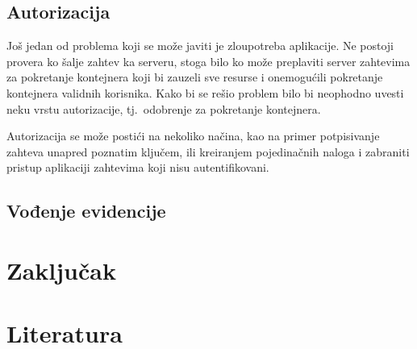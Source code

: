 \documentclass[12pt]{report}
\begin{document}
\section{Autorizacija}
Još jedan od problema koji se može javiti je zloupotreba aplikacije. Ne postoji provera ko šalje zahtev ka serveru, stoga bilo ko može preplaviti server zahtevima za pokretanje kontejnera koji bi zauzeli sve resurse i onemogućili pokretanje kontejnera validnih korisnika. Kako bi se rešio problem bilo bi neophodno uvesti neku vrstu autorizacije, tj.\ odobrenje za pokretanje kontejnera.

Autorizacija se može postići na nekoliko načina, kao na primer potpisivanje zahteva unapred poznatim ključem, ili kreiranjem pojedinačnih naloga i zabraniti pristup aplikaciji zahtevima koji nisu autentifikovani.

\section{Vođenje evidencije}

\chapter{Zaključak}

\chapter{Literatura}
\printbibliography[heading=none]
\end{document}
